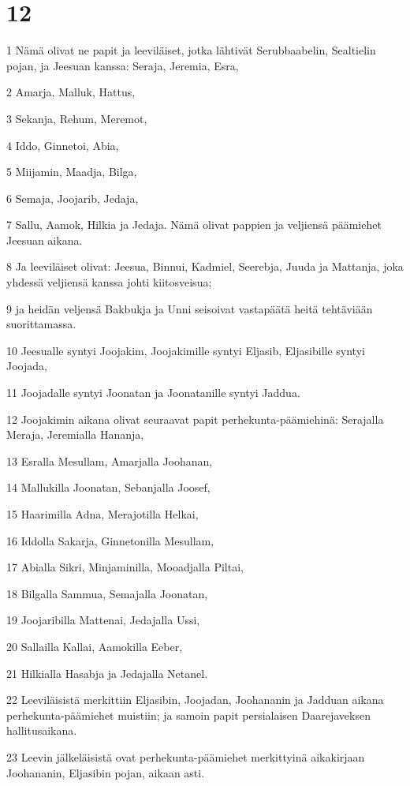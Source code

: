 \chapter{12}

\par 1 Nämä olivat ne papit ja leeviläiset, jotka lähtivät Serubbaabelin, Sealtielin pojan, ja Jeesuan kanssa: Seraja, Jeremia, Esra,
\par 2 Amarja, Malluk, Hattus,
\par 3 Sekanja, Rehum, Meremot,
\par 4 Iddo, Ginnetoi, Abia,
\par 5 Miijamin, Maadja, Bilga,
\par 6 Semaja, Joojarib, Jedaja,
\par 7 Sallu, Aamok, Hilkia ja Jedaja. Nämä olivat pappien ja veljiensä päämiehet Jeesuan aikana.
\par 8 Ja leeviläiset olivat: Jeesua, Binnui, Kadmiel, Seerebja, Juuda ja Mattanja, joka yhdessä veljiensä kanssa johti kiitosveisua;
\par 9 ja heidän veljensä Bakbukja ja Unni seisoivat vastapäätä heitä tehtäviään suorittamassa.
\par 10 Jeesualle syntyi Joojakim, Joojakimille syntyi Eljasib, Eljasibille syntyi Joojada,
\par 11 Joojadalle syntyi Joonatan ja Joonatanille syntyi Jaddua.
\par 12 Joojakimin aikana olivat seuraavat papit perhekunta-päämiehinä: Serajalla Meraja, Jeremialla Hananja,
\par 13 Esralla Mesullam, Amarjalla Joohanan,
\par 14 Mallukilla Joonatan, Sebanjalla Joosef,
\par 15 Haarimilla Adna, Merajotilla Helkai,
\par 16 Iddolla Sakarja, Ginnetonilla Mesullam,
\par 17 Abialla Sikri, Minjaminilla, Mooadjalla Piltai,
\par 18 Bilgalla Sammua, Semajalla Joonatan,
\par 19 Joojaribilla Mattenai, Jedajalla Ussi,
\par 20 Sallailla Kallai, Aamokilla Eeber,
\par 21 Hilkialla Hasabja ja Jedajalla Netanel.
\par 22 Leeviläisistä merkittiin Eljasibin, Joojadan, Joohananin ja Jadduan aikana perhekunta-päämiehet muistiin; ja samoin papit persialaisen Daarejaveksen hallitusaikana.
\par 23 Leevin jälkeläisistä ovat perhekunta-päämiehet merkittyinä aikakirjaan Joohananin, Eljasibin pojan, aikaan asti.
